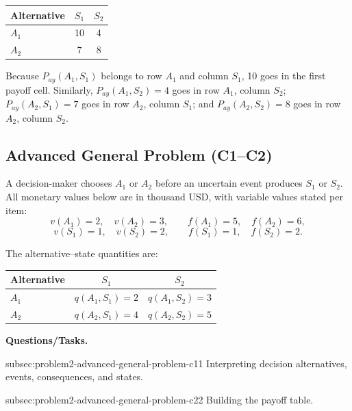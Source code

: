 	\begin{center}
		\begin{tabular}{lcc}
			\toprule
			Alternative & $S_1$ & $S_2$ \\
			\midrule
			$A_1$ & 10 & 4 \\
			$A_2$ & 7 & 8 \\
			\bottomrule
		\end{tabular}
	\end{center}
	
	Because $P_{ay}(A_1,S_1)$ belongs to row $A_1$ and column $S_1$, 10 goes in the first payoff cell. Similarly, $P_{ay}(A_1,S_2)=4$ goes in row $A_1$, column $S_2$; $P_{ay}(A_2,S_1)=7$ goes in row $A_2$, column $S_1$; and $P_{ay}(A_2,S_2)=8$ goes in row $A_2$, column $S_2$.
	
	
	\subsection{Advanced General Problem (C1--C2)}
	\label{sec:problem2-advanced-general-problem-c1-c2}
	
	A decision-maker chooses $A_1$ or $A_2$ before an uncertain event produces $S_1$ or $S_2$. All monetary values below are in thousand USD, with variable values stated per item:
	\[
	v(A_1)=2,\quad v(A_2)=3,\qquad
	f(A_1)=5,\quad f(A_2)=6,
	\]
	\[
	v(S_1)=1,\quad v(S_2)=2,\qquad
	f(S_1)=1,\quad f(S_2)=2.
	\]
	
	The alternative--state quantities are:
	\begin{center}
		\begin{tabular}{lcc}
			\toprule
			Alternative & $S_1$ & $S_2$ \\
			\midrule
			$A_1$ & $q(A_1,S_1)=2$ & $q(A_1,S_2)=3$ \\
			$A_2$ & $q(A_2,S_1)=4$ & $q(A_2,S_2)=5$ \\
			\bottomrule
		\end{tabular}
	\end{center}
	
	\textbf{Questions/Tasks.}
	\begin{enumerate}
		\CriterionTask
		{subsec:problem2-advanced-general-problem-c1}{1}
		{Interpreting decision alternatives, events, consequences, and states.}
		
		\CriterionTask
		{subsec:problem2-advanced-general-problem-c2}{2}
		{Building the payoff table.}
	\end{enumerate}
	
